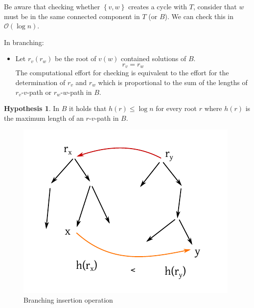 \documentclass[a4paper]{article}
\theoremstyle{definition}
\newtheorem{hypothesis}[theorem]{Hypothesis}
\newcommand{\set}[1]{\left\{#1\right\}}
\newcommand{\gath}[2]{$#1$-$#2$-path} %
\begin{document}
Be aware that checking whether $\set{v, w}$ creates a cycle with $T$, consider that $w$ must be in the same connected component in $T$ (or $B$).
We can check this in $\mathcal{O}(\log{n})$.

In branching:
\begin{itemize}
  \item Let $r_v(r_w)$ be the root of $v(w)$ contained solutions of $B$.
    \[
      r_v = r_w
    \]
    The computational effort for checking is equivalent to the effort for the determination of $r_v$ and $r_w$
    which is proportional to the sum of the lengths of \gath{r_v}{v} or \gath{r_w}{w} in $B$.
\end{itemize}

\begin{hypothesis}
  In $B$ it holds that $h(r) \leq \log{n}$ for every root $r$ where $h(r)$ is the maximum length of an \gath rv in $B$.
\end{hypothesis}

\begin{figure}[ht]
  \begin{center}
    \includegraphics{img/branching_insertion.pdf}
    \caption{Branching insertion operation}
  \end{center}
\end{figure}
\end{document}

